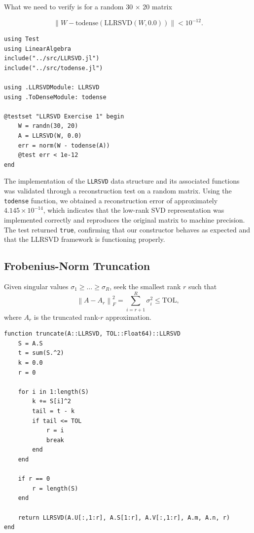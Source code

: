 \documentclass[11pt]{report}
\begin{document}
What we need to verify is for a random 30 $\times$ 20 matrix 

\[
\| W - \text{todense}(\text{LLRSVD}(W, 0.0)) \| < 10^{-12}.
\]



\begin{lstlisting}
using Test
using LinearAlgebra
include("../src/LLRSVD.jl")
include("../src/todense.jl")

using .LLRSVDModule: LLRSVD
using .ToDenseModule: todense

@testset "LLRSVD Exercise 1" begin
    W = randn(30, 20)
    A = LLRSVD(W, 0.0)
    err = norm(W - todense(A))
    @test err < 1e-12
end
\end{lstlisting}

The implementation of the \texttt{LLRSVD} data structure and its associated
functions was validated through a reconstruction test on a random matrix.
Using the \texttt{todense} function, we obtained a reconstruction error of
approximately $4.145 \times 10^{-14}$, which indicates that the low-rank SVD
representation was implemented correctly and reproduces the original matrix to
machine precision. The test returned \texttt{true}, confirming that our
constructor behaves as expected and that the LLRSVD framework is functioning
properly.

\subsection{Frobenius-Norm Truncation}

Given singular values \(\sigma_1 \ge \dots \ge \sigma_R\), seek the smallest rank \(r\) such that
\begin{equation}
    \left\| A - A_r \right\|_F^2
    = \sum_{i=r+1}^{R} \sigma_i^2 \le \mathrm{TOL},
\end{equation}
where \(A_r\) is the truncated rank-\(r\) approximation.

\begin{lstlisting}
function truncate(A::LLRSVD, TOL::Float64)::LLRSVD
    S = A.S
    t = sum(S.^2)
    k = 0.0
    r = 0

    for i in 1:length(S)
        k += S[i]^2
        tail = t - k
        if tail <= TOL
            r = i
            break
        end
    end

    if r == 0
        r = length(S)
    end

    return LLRSVD(A.U[:,1:r], A.S[1:r], A.V[:,1:r], A.m, A.n, r)
end
\end{lstlisting}
\end{document}

